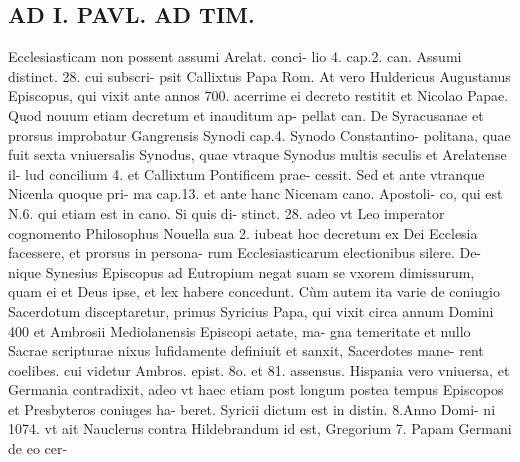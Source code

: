 \documentclass{article}
\begin{document}
\begin{pages}
\section*{AD I. PAVL. AD TIM. }
\marginpar{[ p.116 ]}\pstart Ecclesiasticam non possent assumi Arelat. conci- lio 4. cap.2. can. Assumi distinct. 28. cui subscri- psit Callixtus Papa Rom. At vero Huldericus Augustanus Episcopus, qui vixit ante annos 700. acerrime ei decreto restitit et Nicolao Papae. Quod nouum etiam decretum et inauditum ap- pellat can. De Syracusanae et prorsus improbatur Gangrensis Synodi cap.4. Synodo Constantino- politana, quae fuit sexta vniuersalis Synodus, quae vtraque Synodus multis seculis et Arelatense il- lud concilium 4. et Callixtum Pontificem prae- cessit. Sed et ante vtranque Nicenla quoque pri- ma cap.13. et ante hanc Nicenam cano. Apostoli- co, qui est N.6. qui etiam est in cano. Si quis di- stinct. 28. adeo vt Leo imperator cognomento Philosophus Nouella sua 2. iubeat hoc decretum ex Dei Ecclesia facessere, et prorsus in persona- rum Ecclesiasticarum electionibus silere. De- nique Synesius Episcopus ad Eutropium negat suam se vxorem dimissurum, quam ei et Deus ipse, et lex habere concedunt. Cùm autem ita varie de coniugio Sacerdotum disceptaretur, primus Syricius Papa, qui vixit circa annum Domini 400 et Ambrosii Mediolanensis Episcopi aetate, ma- gna temeritate et nullo Sacrae scripturae nixus lufidamente definiuit et sanxit, Sacerdotes mane- rent coelibes. cui videtur Ambros. epist. 8o. et 81. assensus. Hispania vero vniuersa, et Germania contradixit, adeo vt haec etiam post longum postea tempus Episcopos et Presbyteros coniuges ha- beret. Syricii dictum est in distin. 8.Anno Domi- ni 1074. vt ait Nauclerus contra Hildebrandum id est, Gregorium 7. Papam Germani de eo cer-  \pend

\end{pages}
\end{document}

